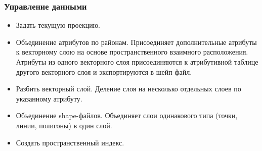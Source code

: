 \begin{frame}
    \frametitle{Управление данными}
    \begin{itemize}
        \item Задать текущую проекцию.
        \item Объединение атрибутов по районам. Присоединяет дополнительные атрибуты к векторному слою на основе пространственного взаимного расположения. Атрибуты из одного векторного слоя присоединяются к атрибутивной таблице другого векторного слоя и экспортируются в шейп-файл.
        \item Разбить векторный слой. Деление слоя на несколько отдельных слоев по указанному атрибуту.
        \item Объединение shape-файлов. Объединяет слои одинакового типа (точки, линии, полигоны) в один слой.
        \item Создать пространственный индекс.
    \end{itemize}
\end{frame}


